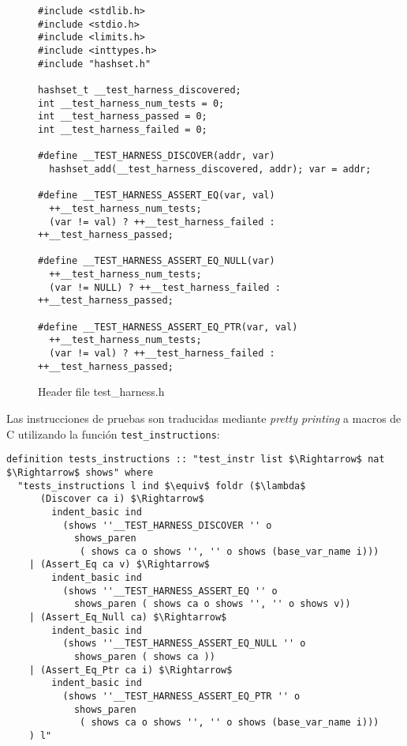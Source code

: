 \begin{figure}
\begin{lstlisting}[mathescape=true]
#include <stdlib.h>
#include <stdio.h>
#include <limits.h>
#include <inttypes.h>
#include "hashset.h"

hashset_t __test_harness_discovered;
int __test_harness_num_tests = 0;
int __test_harness_passed = 0;
int __test_harness_failed = 0;

#define __TEST_HARNESS_DISCOVER(addr, var)
  hashset_add(__test_harness_discovered, addr); var = addr;

#define __TEST_HARNESS_ASSERT_EQ(var, val)
  ++__test_harness_num_tests;
  (var != val) ? ++__test_harness_failed : ++__test_harness_passed;

#define __TEST_HARNESS_ASSERT_EQ_NULL(var)
  ++__test_harness_num_tests;
  (var != NULL) ? ++__test_harness_failed : ++__test_harness_passed;

#define __TEST_HARNESS_ASSERT_EQ_PTR(var, val)
  ++__test_harness_num_tests;
  (var != val) ? ++__test_harness_failed : ++__test_harness_passed;
\end{lstlisting}

\caption{Header file test\_harness.h}
\label{fig:header_test_harness}
\end{figure}


Las instrucciones de pruebas son traducidas mediante \textit{pretty printing} a macros de C utilizando la función \verb|test_instructions|:

\begin{lstlisting}[mathescape=true, frame=single]
definition tests_instructions :: "test_instr list $\Rightarrow$ nat $\Rightarrow$ shows" where
  "tests_instructions l ind $\equiv$ foldr ($\lambda$
      (Discover ca i) $\Rightarrow$
        indent_basic ind
          (shows ''__TEST_HARNESS_DISCOVER '' o
            shows_paren
             ( shows ca o shows '', '' o shows (base_var_name i)))
    | (Assert_Eq ca v) $\Rightarrow$
        indent_basic ind
          (shows ''__TEST_HARNESS_ASSERT_EQ '' o
            shows_paren ( shows ca o shows '', '' o shows v))
    | (Assert_Eq_Null ca) $\Rightarrow$
        indent_basic ind
          (shows ''__TEST_HARNESS_ASSERT_EQ_NULL '' o
            shows_paren ( shows ca ))
    | (Assert_Eq_Ptr ca i) $\Rightarrow$
        indent_basic ind
          (shows ''__TEST_HARNESS_ASSERT_EQ_PTR '' o
            shows_paren
             ( shows ca o shows '', '' o shows (base_var_name i)))
    ) l"
\end{lstlisting}


